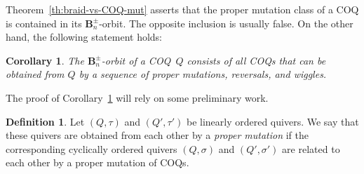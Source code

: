 \documentclass[11pt, letterpaper]{amsart}
\newcommand{\cS}[1]{{\noindent\textsf{\color{purple}$\blacksquare$~#1~$\blacksquare$}}}
\newtheorem{corollary}[theorem]{Corollary}
\theoremstyle{definition}
\newtheorem{definition}[theorem]{Definition}
\numberwithin{equation}{section}
\def\In{{\operatorname{In}}}
\def\Out{{\operatorname{Out}}}
\begin{document}

Theorem~\ref{th:braid-vs-COQ-mut} asserts that 
the proper mutation class of a COQ is contained in its $\mathbf{B}_n^\pm$-orbit.
The opposite inclusion is usually false.  
On the other hand, the following statement holds: 

\begin{corollary}
\label{cor:braid-orbit-via-mut}
The $\mathbf{B}_n^\pm$-orbit of a COQ~$Q$
consists of all COQs that can be obtained from $Q$ by a sequence of proper mutations,  
reversals, and wiggles. 
\end{corollary}

The proof of Corollary~\ref{cor:braid-orbit-via-mut} will rely on some preliminary work. 

\begin{definition}
\label{def:proper-mu-LOQ}
Let $(Q,\tau)$ and $(Q',\tau')$ be linearly ordered quivers. 
We say that these quivers are obtained from each other by a \emph{proper mutation} 
if the corresponding cyclically ordered quivers $(Q,\sigma)$ and $(Q',\sigma')$ are related to each other by 
a proper mutation of COQs. 
\end{definition}
\end{document}
